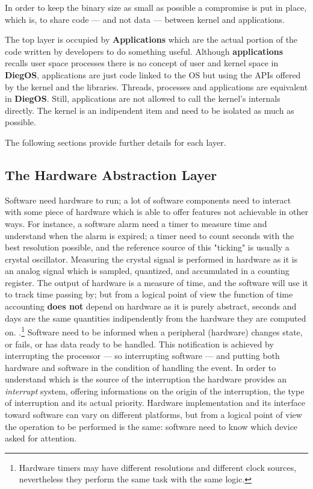 \documentclass[11pt,b5paper]{scrbook}
\newcommand{\myOS}{{\color{SteelBlue}\textbf{DiegOS}}}
\begin{document}
In order to keep the binary size as small as possible a compromise is put in
place, which is, to share code --- and not data --- between kernel and
applications.

The top layer is occupied by {\color{Green}\textbf{Applications}} which are the actual
portion of the code written by developers to do something useful. Although
\textbf{applications} recalls user space processes there is no concept of user and 
kernel space in {\myOS}, applications are just code linked to the OS but using the 
APIs offered by the kernel and the libraries.
Threads, processes and applications are equivalent in {\myOS}.
Still, applications are not allowed to call the kernel's internals directly.
The kernel is an indipendent item and need to be isolated as much as possible.

The following sections provide further details for each layer.

\subsection{The Hardware Abstraction Layer}
\label{subsec:hal}
Software need hardware to run; a lot of software components need to interact 
with some piece of hardware which is able to offer features not achievable in
other ways.
For instance, a software alarm need a timer to measure time and understand when
the alarm is expired; a timer need to count seconds with the best resolution possible,
and the reference source of this "ticking" is usually a crystal oscillator.
Measuring the crystal signal is performed in hardware as it is an analog signal which
is sampled, quantized, and accumulated in a counting register.
The output of hardware is a measure of time, and the software will
use it to track time passing by; but from a logical point of view the
function of time accounting \textbf{does not} depend on hardware as it is purely abstract,
seconds and days are the same quantities indipendently from the hardware they are computed on.
.\footnote{Hardware timers may have different resolutions and different
clock sources, nevertheless they perform the same task with the same logic.}
Software need to be informed when a peripheral (hardware) changes state, or
fails, or has data ready to be handled.
This notification is achieved by interrupting the processor --- so interrupting software
--- and putting both hardware and software in the condition of handling the
event.
In order to understand which is the source of the interruption the hardware provides
an \textit{interrupt} system,
offering informations on the origin of the interruption, the type of
interruption and its actual priority.
Hardware implementation and its interface toward software can vary on different platforms,
but from a logical point of
view the operation to be performed is the same: software need to know which
device asked for attention.
\end{document}
